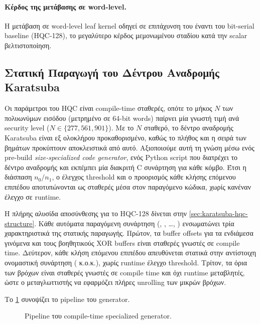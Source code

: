 \paragraph{Κέρδος της μετάβασης σε word-level.}
Η μετάβαση σε word-level \clmul{} leaf kernel οδηγεί σε επιτάχυνση 
του \instret έναντι του bit-serial baseline (HQC-128), το μεγαλύτερο κέρδος
μεμονωμένου σταδίου κατά την scalar βελτιστοποίηση.

\subsection{Στατική Παραγωγή του Δέντρου Αναδρομής Karatsuba}
\label{ssec:specialized-tree}

Οι παράμετροι του HQC είναι compile-time σταθερές, οπότε το μήκος
$N$ των πολυωνύμων εισόδου (μετρημένο σε \num{64}-bit words) παίρνει μία
γνωστή τιμή ανά security level ($N \in \{277, 561, 901\}$). Με το $N$
σταθερό, το δέντρο αναδρομής Karatsuba είναι εξ ολοκλήρου
προκαθορισμένο, καθώς το πλήθος και η σειρά των βημάτων προκύπτουν
αποκλειστικά από αυτό. Αξιοποιούμε αυτή τη γνώση μέσω ενός pre-build
\emph{size-specialized code generator}, ενός Python script που διατρέχει
το δέντρο αναδρομής και εκπέμπει μία διακριτή C συνάρτηση για κάθε κόμβο.
Έτσι η διάσπαση $n_0/n_1$, ο έλεγχος threshold και ο προορισμός κάθε
κλήσης επόμενου επιπέδου αποτυπώνονται ως σταθερές μέσα στον παραγόμενο
κώδικα, χωρίς κανέναν έλεγχο σε runtime.

Η πλήρης αλυσίδα αποσύνθεσης για το HQC-128 δίνεται στην
\cref{sec:karatsuba-hqc-structure}. 
Κάθε αυτόματα παραγόμενη συνάρτηση (, ,
\ldots, ) ενσωματώνει τρία χαρακτηριστικά της στατικής
παραγωγής. Πρώτον, τα buffer offsets για τα ενδιάμεσα γινόμενα και τους
βοηθητικούς XOR buffers είναι σταθερές γνωστές σε compile time. Δεύτερον,
κάθε κλήση επόμενου επιπέδου απευθύνεται στατικά στην αντίστοιχη
ονομαστική συνάρτηση ( κ.ο.κ.), χωρίς runtime έλεγχο
threshold. Τρίτον, τα όρια των βρόχων είναι σταθερές γνωστές σε compile
time και όχι runtime μεταβλητές, ώστε ο μεταγλωττιστής να εφαρμόζει
πλήρες unrolling των μικρών βρόχων.

Το \cref{fig:specialized-tree-pipeline} συνοψίζει το pipeline του generator.

\begin{figure}[htbp]
  \centering
  
  \caption{Pipeline του compile-time specialized generator.}
  \label{fig:specialized-tree-pipeline}
\end{figure}


